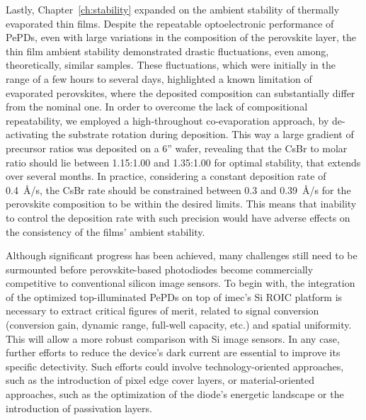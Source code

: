 Lastly, Chapter~\ref{ch:stability} expanded on the ambient stability of thermally evaporated  thin films. Despite the repeatable optoelectronic performance of PePDs, even with large variations in the composition of the perovskite layer, the thin film ambient stability demonstrated drastic fluctuations, even among, theoretically, similar samples. These fluctuations, which were initially in the range of a few hours to several days, highlighted a known limitation of evaporated perovskites, where the deposited composition can substantially differ from the nominal one. In order to overcome the lack of compositional repeatability, we employed a high-throughout co-evaporation approach, by de-activating the substrate rotation during deposition. This way a large gradient of precursor ratios was deposited on a 6'' wafer, revealing that the CsBr to  molar ratio should lie between 1.15:1.00 and 1.35:1.00 for optimal stability, that extends over several months. In practice, considering a constant  deposition rate of 0.4~\AA/s, the CsBr rate should be constrained between 0.3 and 0.39~\AA/s for the perovskite composition to be within the desired limits. This means that inability to control the deposition rate with such precision would have adverse effects on the consistency of the films' ambient stability. 

Although significant progress has been achieved, many challenges still need to be surmounted before perovskite-based photodiodes become commercially competitive to conventional silicon image sensors. To begin with, the integration of the optimized top-illuminated PePDs on top of imec's Si ROIC platform is necessary to extract critical figures of merit, related to signal conversion (conversion gain, dynamic range, full-well capacity, etc.) and spatial uniformity. This will allow a more robust comparison with Si image sensors. In any case, further efforts to reduce the device's dark current are essential to improve its specific detectivity. Such efforts could involve technology-oriented approaches, such as the introduction of pixel edge cover layers, or material-oriented approaches, such as the optimization of the diode's energetic landscape or the introduction of passivation layers. 


